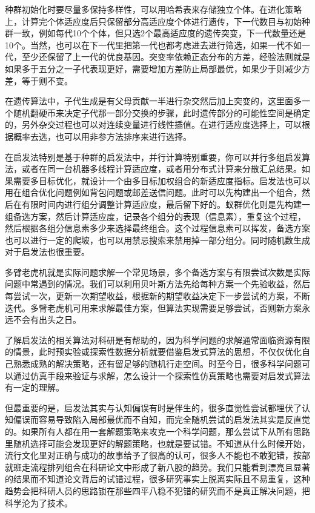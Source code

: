 \documentclass[]{tufte-book}
\begin{document}
种群初始化时要尽量多保持多样性，可以用哈希表来存储独立个体。在进化策略上，计算完个体适应度后只保留部分高适应度个体进行遗传，下一代数目与初始种群一致，例如每代10个个体，但只选2个最高适应度的遗传突变，下一代数量还是10个。当然，也可以在下一代里把第一代也都考虑进去进行筛选，如果一代不如一代，至少还保留了上一代的优良基因。突变率依赖正态分布的方差，经验法则就是如果多于五分之一子代表现更好，需要增加方差防止局部最优，如果少于则减少方差，等于则不变。

在遗传算法中，子代生成是有父母贡献一半进行杂交然后加上突变的，这里面多一个随机翻硬币来决定子代那一部分交换的步骤，此时遗传部分的可能性空间是确定的，另外杂交过程也可以对连续变量进行线性插值。在进行适应度选择上，可以根据概率去选，也可以用非参方法排序来进行选择。

在启发法特别是基于种群的启发法中，并行计算特别重要，你可以并行多组启发算法，或者在同一台机器多线程计算适应度，或者用分布式计算来分散汇总结果。如果需要多目标优化，就设计一个由多目标加权组合的新适应度指标。启发法也可以用在组合优化问题例如背包问题或邮差送信问题。此时可以先构建出一个组合，然后在有限时间内进行组分调整计算适应度，最后留下好的。蚁群优化则是先构建一组备选方案，然后计算适应度，记录各个组分的表现（信息素），重复这个过程，然后根据各组分信息素多少来选择最终组合。这个过程信息素可以挥发，备选方案也可以进行一定的爬坡，也可以用禁忌搜索来禁用掉一部分组分。同时随机数生成对于启发法也很重要。

多臂老虎机就是实际问题求解一个常见场景，多个备选方案与有限尝试次数是实际问题中常遇到的情况。我们可以利用贝叶斯方法先给每种方案一个先验收益，然后每尝试一次，更新一次期望收益，根据新的期望收益决定下一步尝试的方案，不断迭代。多臂老虎机可用来求解最佳方案，但算法实现需要足够尝试，否则新方案永远不会有出头之日。

了解启发法的相关算法对科研是有帮助的，因为科学问题的求解通常面临资源有限的情景，此时预实验或探索性数据分析就要借鉴启发式算法的思想，不仅仅优化自己熟悉成熟的解决策略，还有留足够的随机行走空间。时至今日，很多科学问题可以通过仿真手段来验证与求解，怎么设计一个探索性仿真策略也需要对启发式算法有一定的理解。

但最重要的是，启发法其实与认知偏误有时是伴生的，很多直觉性尝试都埋伏了认知偏误而容易导致陷入局部最优而不自知，而完全随机尝试的启发法其实是反直觉的。如果所有人都在用一套解题策略来攻克一个科学问题，那么尝试下从所有思路里随机选择可能会发现更好的解题策略，也就是要试错。不知道从什么时候开始，流行文化里对正确与成功的故事给予了很高的认可，很多人不能也不敢犯错，按部就班走流程排列组合在科研论文中形成了新八股的趋势。我们只能看到漂亮且显著的结果而不知道论文背后的试错过程，很多研究事实上脱离实际且不易重复，这种趋势会把科研人员的思路锁在那些四平八稳不犯错的研究而不是真正解决问题，把科学沦为了技术。
\end{document}
